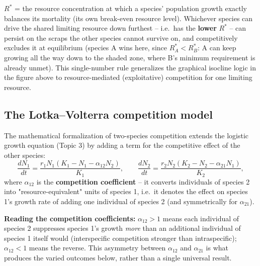 \documentclass[11pt,a4paper]{article}
\begin{document}
\begin{figbox}[title={Tilman's $R^*$ rule for exploitative competition}]
\centering
{}

\vspace{4mm}
\footnotesize $R^*$ = the resource concentration at which a species' population growth exactly balances its mortality (its own break-even resource level). Whichever species can drive the shared limiting resource down furthest -- i.e.\ has the \textbf{lower} $R^*$ -- can persist on the scraps the other species cannot survive on, and competitively excludes it at equilibrium (species A wins here, since $R^*_A<R^*_B$: A can keep growing all the way down to the shaded zone, where B's minimum requirement is already unmet). This single-number rule generalizes the graphical isocline logic in the figure above to resource-mediated (exploitative) competition for one limiting resource.
\end{figbox}

\subsection{The Lotka--Volterra competition model}
The mathematical formalization of two-species competition extends the logistic growth equation (Topic 3) by adding a term for the competitive effect of the other species:
\[
\frac{dN_1}{dt} = \frac{r_1 N_1 (K_1 - N_1 - \alpha_{12}N_2)}{K_1}, \qquad
\frac{dN_2}{dt} = \frac{r_2 N_2 (K_2 - N_2 - \alpha_{21}N_1)}{K_2},
\]
where $\alpha_{12}$ is the \textbf{competition coefficient} -- it converts individuals of species 2 into "resource-equivalent" units of species 1, i.e.\ it denotes the effect on species 1's growth rate of adding one individual of species 2 (and symmetrically for $\alpha_{21}$).

\begin{keybox}
\textbf{Reading the competition coefficients:} $\alpha_{12} > 1$ means each individual of species 2 suppresses species 1's growth \emph{more} than an additional individual of species 1 itself would (interspecific competition stronger than intraspecific); $\alpha_{12} < 1$ means the reverse. This asymmetry between $\alpha_{12}$ and $\alpha_{21}$ is what produces the varied outcomes below, rather than a single universal result.
\end{keybox}
\end{document}
